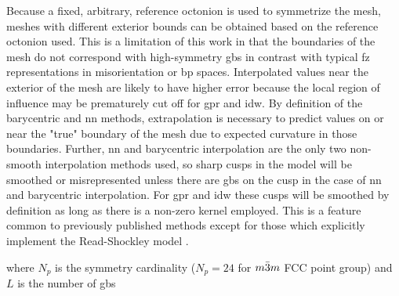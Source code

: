 \documentclass[preprint,12pt]{elsarticle}
\begin{document}
Because a fixed, arbitrary, reference octonion is used to symmetrize the mesh, meshes with different exterior bounds can be obtained based on the reference octonion used. This is a limitation of this work in that the boundaries of the mesh do not correspond with high-symmetry \glspl{gb} in contrast with typical \gls{fz} representations in misorientation \cite{reynoldsInterfacesCrystallineMaterials1997} or \gls{bp} \cite{patalaSymmetriesRepresentationGrain2013,homerGrainBoundaryPlane2015} spaces. Interpolated values near the exterior of the mesh are likely to have higher error because the local region of influence may be prematurely cut off for \gls{gpr} and \gls{idw}. By definition of the barycentric and \gls{nn} methods, extrapolation is necessary to predict values on or near the "true" boundary of the mesh due to expected curvature in those boundaries. Further, \gls{nn} and barycentric interpolation are the only two non-smooth interpolation methods used, so sharp cusps in the model will be smoothed or misrepresented unless there are \glspl{gb} on the cusp in the case of \gls{nn} and barycentric interpolation. For \gls{gpr} and \gls{idw} these cusps will be smoothed by definition as long as there is a non-zero kernel employed. This is a feature common to previously published methods \cite{liRelativeGrainBoundary2009,shenDeterminingGrainBoundary2019,chesserLearningGrainBoundary2020} except for those \cite{bulatovGrainBoundaryEnergy2014,shekhawatGeneralizedReadShockley2016} which explicitly implement the Read-Shockley model \cite{readDislocationModelsCrystal1950}.


where $N_p$ is the symmetry cardinality ($N_p=24$ for $m\Bar{3}m$ FCC point group) and $L$ is the number of \glspl{gb}

  
\end{document}
